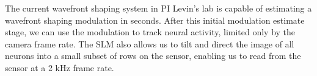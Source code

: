 

 
The current wavefront shaping system in PI Levin's lab is capable of estimating a wavefront shaping modulation in seconds. After this initial modulation estimate stage, we can use the modulation to track neural activity, limited only by the camera frame rate. The SLM also allows us to tilt and direct the image of all neurons into a small subset of rows on the sensor, enabling us to read from the sensor at a 2 kHz frame rate.

